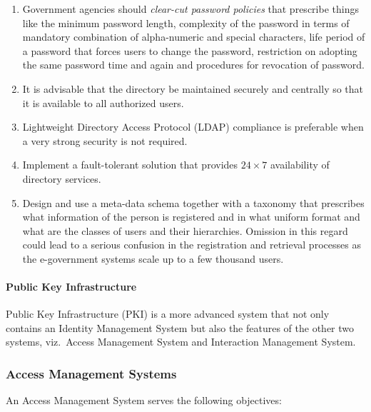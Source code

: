  \begin{enumerate}[label=(\alph*)]
 	\item Government agencies should \textit{clear-cut password policies} that prescribe things like the minimum password length, complexity of the password in terms of mandatory combination of alpha-numeric and special characters, life period of
 	a password that forces users to change the password, restriction on adopting the
 	same password time and again and procedures for revocation of password.
 	
 	\item It is advisable that the directory be maintained securely and centrally so that
 	it is available to all authorized users.
 	
 	\item Lightweight Directory Access Protocol (LDAP) compliance is preferable
 	when a very strong security is not required.
 	
 	\item Implement a fault-tolerant solution that provides $ 24 \times 7 $ availability of
 	directory services.
 	
 	\item Design and use a meta-data schema together with a taxonomy that prescribes
 	what information of the person is registered and in what uniform format and what
 	are the classes of users and their hierarchies. Omission in this regard could lead
 	to a serious confusion in the registration and retrieval processes as the
 	e-government systems scale up to a few thousand users.
 \end{enumerate}
 
 \paragraph*{Public Key Infrastructure}
 Public Key Infrastructure (PKI) is a more advanced system that not only
 contains an Identity Management System but also the features of the other two
 systems, viz.\ Access Management System and Interaction Management System.

 
 
 
 \subsubsection*{Access Management Systems}
 An Access Management System serves the following objectives:
 
